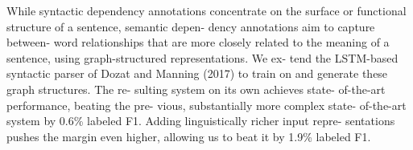 While syntactic dependency annotations concentrate on the surface or functional structure of a sentence, semantic depen- dency annotations aim to capture between- word relationships that are more closely related to the meaning of a sentence, using graph-structured representations. We ex- tend the LSTM-based syntactic parser of Dozat and Manning (2017) to train on and generate these graph structures. The re- sulting system on its own achieves state- of-the-art performance, beating the pre- vious, substantially more complex state- of-the-art system by 0.6\% labeled F1. Adding linguistically richer input repre- sentations pushes the margin even higher, allowing us to beat it by 1.9\% labeled F1.
